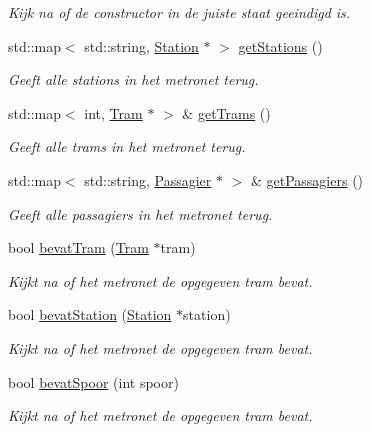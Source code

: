 \begin{DoxyCompactItemize}
\begin{DoxyCompactList}\small\item\em Kijk na of de constructor in de juiste staat geeindigd is. \end{DoxyCompactList}\item 
std\+::map$<$ std\+::string, \hyperlink{class_station}{Station} $\ast$ $>$ \hyperlink{class_metronet_a756f8163c67c4e559699b9c508fb1346}{get\+Stations} ()
\begin{DoxyCompactList}\small\item\em Geeft alle stations in het metronet terug. \end{DoxyCompactList}\item 
std\+::map$<$ int, \hyperlink{class_tram}{Tram} $\ast$ $>$ \& \hyperlink{class_metronet_a9aab7bfe14dbd5f7e258a55007542c36}{get\+Trams} ()
\begin{DoxyCompactList}\small\item\em Geeft alle trams in het metronet terug. \end{DoxyCompactList}\item 
std\+::map$<$ std\+::string, \hyperlink{class_passagier}{Passagier} $\ast$ $>$ \& \hyperlink{class_metronet_a76ffa64edd87b4b6d47c0486b4ef27ab}{get\+Passagiers} ()
\begin{DoxyCompactList}\small\item\em Geeft alle passagiers in het metronet terug. \end{DoxyCompactList}\item 
bool \hyperlink{class_metronet_a0bcafdae671ac5fff7a4b54429f440ba}{bevat\+Tram} (\hyperlink{class_tram}{Tram} $\ast$tram)
\begin{DoxyCompactList}\small\item\em Kijkt na of het metronet de opgegeven tram bevat. \end{DoxyCompactList}\item 
bool \hyperlink{class_metronet_a8f2d201eee99681d122fd9031cf4d6c6}{bevat\+Station} (\hyperlink{class_station}{Station} $\ast$station)
\begin{DoxyCompactList}\small\item\em Kijkt na of het metronet de opgegeven tram bevat. \end{DoxyCompactList}\item 
bool \hyperlink{class_metronet_a0404525187984ca1fc437eef7a09e54a}{bevat\+Spoor} (int spoor)
\begin{DoxyCompactList}\small\item\em Kijkt na of het metronet de opgegeven tram bevat. \end{DoxyCompactList}\item 

\end{DoxyCompactItemize}
